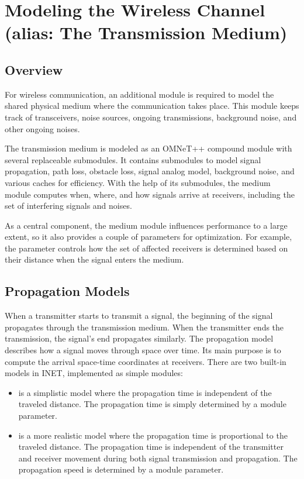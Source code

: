 \chapter{Modeling the Wireless Channel (alias: The Transmission Medium)}
\label{cha:transmission-medium}

\section{Overview}

For wireless communication, an additional module is required to model the
shared physical medium where the communication takes place. This module
keeps track of transceivers, noise sources, ongoing transmissions,
background noise, and other ongoing noises.

The transmission medium is modeled as an OMNeT++ compound module with
several replaceable submodules. It contains submodules to model signal
propagation, path loss, obstacle loss, signal analog model, background
noise, and various caches for efficiency. With the help of its submodules,
the medium module computes when, where, and how signals arrive at
receivers, including the set of interfering signals and noises.

As a central component, the medium module influences performance to a large
extent, so it also provides a couple of parameters for optimization. For
example, the  parameter controls how the set of affected
receivers is determined based on their distance when the signal enters the
medium.

\section{Propagation Models}

When a transmitter starts to transmit a signal, the beginning of the signal
propagates through the transmission medium. When the transmitter ends the
transmission, the signal's end propagates similarly. The propagation model
describes how a signal moves through space over time. Its main purpose is
to compute the arrival space-time coordinates at receivers. There are two
built-in models in INET, implemented as simple modules:

\begin{itemize}
        \item {} is a simplistic model where the propagation time is independent of the traveled distance. The propagation time is simply determined by a module parameter.
        \item {} is a more realistic model where the propagation time is proportional to the traveled distance. The propagation time is independent of the transmitter and receiver movement during both signal transmission and propagation. The propagation speed is determined by a module parameter.
\end{itemize}

